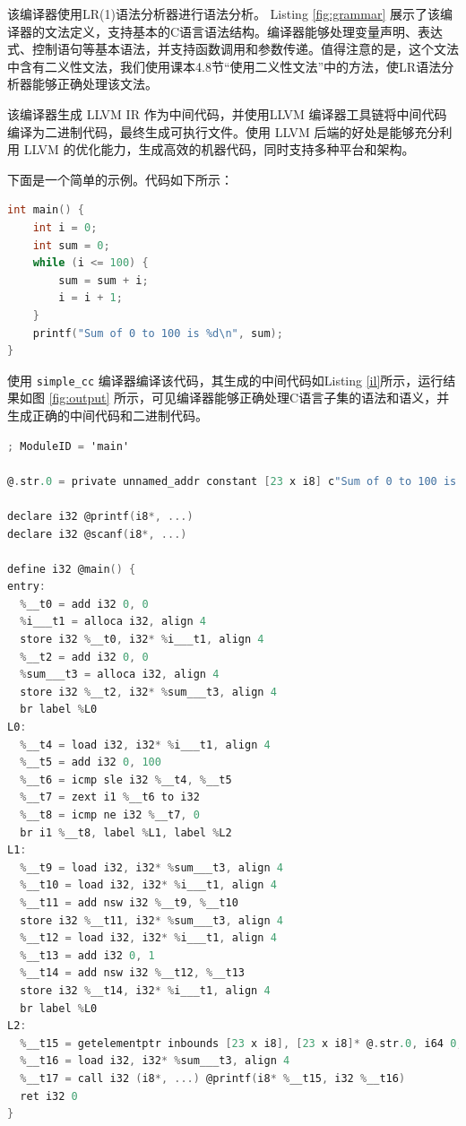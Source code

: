 \documentclass[a4paper]{article}
\begin{document}
该编译器使用LR(1)语法分析器进行语法分析。
Listing \ref{fig:grammar} 展示了该编译器的文法定义，支持基本的C语言语法结构。编译器能够处理变量声明、表达式、控制语句等基本语法，并支持函数调用和参数传递。值得注意的是，这个文法中含有二义性文法，我们使用课本4.8节``使用二义性文法''中的方法，使LR语法分析器能够正确处理该文法。

该编译器生成 LLVM IR 作为中间代码，并使用LLVM 编译器工具链将中间代码编译为二进制代码，最终生成可执行文件。使用 LLVM 后端的好处是能够充分利用 LLVM 的优化能力，生成高效的机器代码，同时支持多种平台和架构。

下面是一个简单的示例。代码如下所示：
\begin{lstlisting}[language=C]
int main() {
    int i = 0;
    int sum = 0;
    while (i <= 100) {
        sum = sum + i;
        i = i + 1;
    }
    printf("Sum of 0 to 100 is %d\n", sum);
}
\end{lstlisting}
使用 \texttt{simple\_cc} 编译器编译该代码，其生成的中间代码如Listing \ref{il}所示，运行结果如图 \ref{fig:output} 所示，可见编译器能够正确处理C语言子集的语法和语义，并生成正确的中间代码和二进制代码。

\begin{lstlisting}[language=C,caption={中间代码},label={il}]
; ModuleID = 'main'

@.str.0 = private unnamed_addr constant [23 x i8] c"Sum of 0 to 100 is %d\0a\00", align 1

declare i32 @printf(i8*, ...)
declare i32 @scanf(i8*, ...)

define i32 @main() {
entry:
  %__t0 = add i32 0, 0
  %i___t1 = alloca i32, align 4
  store i32 %__t0, i32* %i___t1, align 4
  %__t2 = add i32 0, 0
  %sum___t3 = alloca i32, align 4
  store i32 %__t2, i32* %sum___t3, align 4
  br label %L0
L0:
  %__t4 = load i32, i32* %i___t1, align 4
  %__t5 = add i32 0, 100
  %__t6 = icmp sle i32 %__t4, %__t5
  %__t7 = zext i1 %__t6 to i32
  %__t8 = icmp ne i32 %__t7, 0
  br i1 %__t8, label %L1, label %L2
L1:
  %__t9 = load i32, i32* %sum___t3, align 4
  %__t10 = load i32, i32* %i___t1, align 4
  %__t11 = add nsw i32 %__t9, %__t10
  store i32 %__t11, i32* %sum___t3, align 4
  %__t12 = load i32, i32* %i___t1, align 4
  %__t13 = add i32 0, 1
  %__t14 = add nsw i32 %__t12, %__t13
  store i32 %__t14, i32* %i___t1, align 4
  br label %L0
L2:
  %__t15 = getelementptr inbounds [23 x i8], [23 x i8]* @.str.0, i64 0, i64 0
  %__t16 = load i32, i32* %sum___t3, align 4
  %__t17 = call i32 (i8*, ...) @printf(i8* %__t15, i32 %__t16)
  ret i32 0
}
\end{lstlisting}
\end{document}
